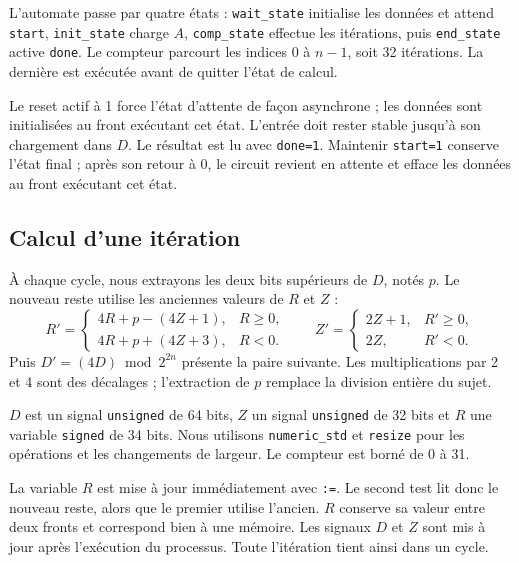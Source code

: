 \documentclass[a4paper,11pt]{article}
\begin{document}
L’automate passe par quatre états : \texttt{wait\_state} initialise les données et attend \texttt{start}, \texttt{init\_state} charge $A$, \texttt{comp\_state} effectue les itérations, puis \texttt{end\_state} active \texttt{done}. Le compteur parcourt les indices 0 à $n-1$, soit 32 itérations. La dernière est exécutée avant de quitter l’état de calcul.

Le reset actif à 1 force l’état d’attente de façon asynchrone ; les données sont initialisées au front exécutant cet état. L’entrée doit rester stable jusqu’à son chargement dans $D$. Le résultat est lu avec \texttt{done=1}. Maintenir \texttt{start=1} conserve l’état final ; après son retour à 0, le circuit revient en attente et efface les données au front exécutant cet état.

\clearpage
\subsection*{Calcul d’une itération}
À chaque cycle, nous extrayons les deux bits supérieurs de $D$, notés $p$. Le nouveau reste utilise les anciennes valeurs de $R$ et $Z$ :
\[
R'=\begin{cases}4R+p-(4Z+1),&R\geq0,\\4R+p+(4Z+3),&R<0.\end{cases}
\qquad
Z'=\begin{cases}2Z+1,&R'\geq0,\\2Z,&R'<0.\end{cases}
\]
Puis $D'=(4D)\bmod 2^{2n}$ présente la paire suivante. Les multiplications par 2 et 4 sont des décalages ; l’extraction de $p$ remplace la division entière du sujet.

$D$ est un signal \texttt{unsigned} de 64 bits, $Z$ un signal \texttt{unsigned} de 32 bits et $R$ une variable \texttt{signed} de 34 bits. Nous utilisons \texttt{numeric\_std} et \texttt{resize} pour les opérations et les changements de largeur. Le compteur est borné de 0 à 31.

La variable $R$ est mise à jour immédiatement avec \texttt{:=}. Le second test lit donc le nouveau reste, alors que le premier utilise l’ancien. $R$ conserve sa valeur entre deux fronts et correspond bien à une mémoire. Les signaux $D$ et $Z$ sont mis à jour après l’exécution du processus. Toute l’itération tient ainsi dans un cycle.
\end{document}
